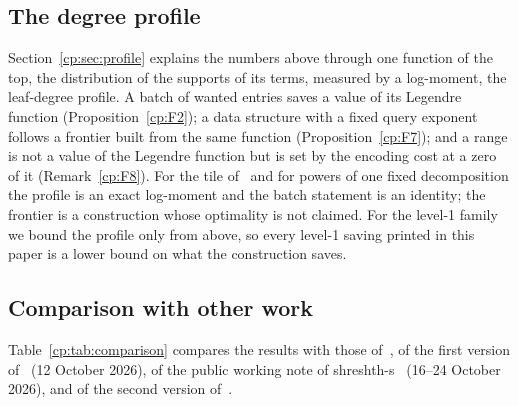 \documentclass[11pt]{article}
\theoremstyle{definition}
\theoremstyle{remark}
\begin{document}
\subsection{The degree profile}\label{cp:sec:intro:profile}

Section~\ref{cp:sec:profile} explains the numbers above through one function of the top, the distribution of the supports of its terms, measured by a log-moment, the leaf-degree profile. A batch of wanted entries saves a value of its Legendre function (Proposition~\ref{cp:F2}); a data structure with a fixed query exponent follows a frontier built from the same function (Proposition~\ref{cp:F7}); and a range is not a value of the Legendre function but is set by the encoding cost at a zero of it (Remark~\ref{cp:F8}). For the tile of~\cite{v2} and for powers of one fixed decomposition the profile is an exact log-moment and the batch statement is an identity; the frontier is a construction whose optimality is not claimed. For the level-1 family we bound the profile only from above, so every level-1 saving printed in this paper is a lower bound on what the construction saves.

\subsection{Comparison with other work}\label{cp:sec:intro:comparison}

Table~\ref{cp:tab:comparison} compares the results with those of~\cite{AV26}, of the first version of~\cite{v2} (12 October 2026), of the public working note of shreshth-s~\cite{Shr26} (16--24 October 2026), and of the second version of~\cite{v2}.
\end{document}
